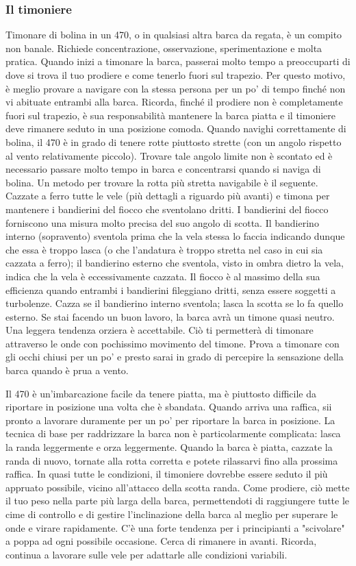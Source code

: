\subsubsection{Il timoniere}
\label{subsubsec:IlTimoniere}
Timonare di bolina in un 470, o in qualsiasi altra barca da regata, è
un compito non banale. Richiede concentrazione, osservazione, sperimentazione e
molta pratica. Quando inizi a timonare la barca, passerai molto tempo a
preoccuparti di dove si trova il tuo prodiere e come tenerlo fuori sul trapezio.
Per questo motivo, è meglio provare a navigare con la stessa persona per un po'
di tempo finché non vi abituate entrambi alla barca. Ricorda, finché il prodiere
non è completamente fuori sul trapezio, è sua responsabilità mantenere la barca
piatta e il timoniere deve rimanere seduto in una posizione comoda. Quando
navighi correttamente di bolina, il 470 è in grado di tenere rotte piuttosto
strette (con un angolo rispetto al vento relativamente piccolo).
Trovare tale angolo limite non è scontato ed è necessario passare molto tempo in barca e concentrarsi
quando si naviga di bolina. Un metodo per trovare la rotta più stretta
navigabile è il seguente. Cazzate a ferro tutte le vele (più dettagli a
riguardo più avanti) e timona per mantenere i bandierini del fiocco che
sventolano dritti. I bandierini del fiocco forniscono una misura molto precisa
del suo angolo di scotta. Il bandierino interno (sopravento) sventola prima che
la vela stessa lo faccia indicando dunque che essa è troppo lasca (o che
l'andatura è troppo stretta nel caso in cui sia cazzata a ferro); il bandierino
esterno che sventola, visto in ombra dietro la vela,
indica che la vela è eccessivamente cazzata. Il fiocco è al massimo della sua efficienza quando
entrambi i bandierini fileggiano dritti, senza essere soggetti a turbolenze.
Cazza se il bandierino interno
sventola; lasca la scotta se lo fa quello esterno. Se stai facendo un buon
lavoro, la barca avrà un timone quasi neutro. Una leggera tendenza orziera è
accettabile. Ciò ti permetterà di timonare attraverso le onde con pochissimo
movimento del timone. Prova a timonare con gli occhi chiusi per un po' e presto
sarai in grado di percepire la sensazione della barca quando è prua a vento.

Il 470 è un'imbarcazione facile da tenere piatta, ma è piuttosto difficile da
riportare in posizione una volta che è sbandata. Quando arriva una raffica,
sii pronto a lavorare duramente per un po' per riportare la barca in posizione.
La tecnica di base per raddrizzare la barca non è particolarmente complicata: lasca
la randa leggermente e orza leggermente. Quando
la barca è piatta, cazzate la randa di nuovo, tornate alla rotta corretta e
potete rilassarvi fino alla prossima raffica. In quasi tutte le condizioni, il
timoniere dovrebbe essere seduto il più appruato possibile, vicino all'attacco
della scotta randa. Come
prodiere, ciò mette il tuo peso nella parte più larga della barca, permettendoti
di raggiungere tutte le cime di controllo e di gestire l'inclinazione della
barca al meglio per superare le onde e virare rapidamente. C'è una forte tendenza per
i principianti a "scivolare" a poppa ad ogni possibile occasione. Cerca di
rimanere in avanti. Ricorda, continua a lavorare sulle vele per adattarle alle
condizioni variabili.

